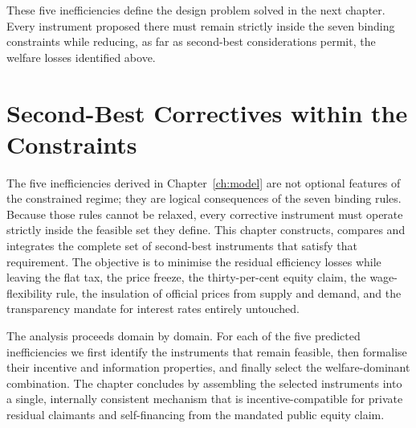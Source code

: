 \documentclass[12pt,anyside]{book}
\theoremstyle{definition}
\theoremstyle{plain}
\theoremstyle{remark}
\begin{document}
These five inefficiencies define the design problem solved in the next chapter. Every instrument proposed there must remain strictly inside the seven binding constraints while reducing, as far as second-best considerations permit, the welfare losses identified above.

\chapter{Second-Best Correctives within the Constraints}
\label{ch:solutions}

The five inefficiencies derived in Chapter~\ref{ch:model} are not optional features of the constrained regime; they are logical consequences of the seven binding rules. Because those rules cannot be relaxed, every corrective instrument must operate strictly inside the feasible set they define. This chapter constructs, compares and integrates the complete set of second-best instruments that satisfy that requirement. The objective is to minimise the residual efficiency losses while leaving the flat tax, the price freeze, the thirty-per-cent equity claim, the wage-flexibility rule, the insulation of official prices from supply and demand, and the transparency mandate for interest rates entirely untouched.

The analysis proceeds domain by domain. For each of the five predicted inefficiencies we first identify the instruments that remain feasible, then formalise their incentive and information properties, and finally select the welfare-dominant combination. The chapter concludes by assembling the selected instruments into a single, internally consistent mechanism that is incentive-compatible for private residual claimants and self-financing from the mandated public equity claim.
\end{document}

